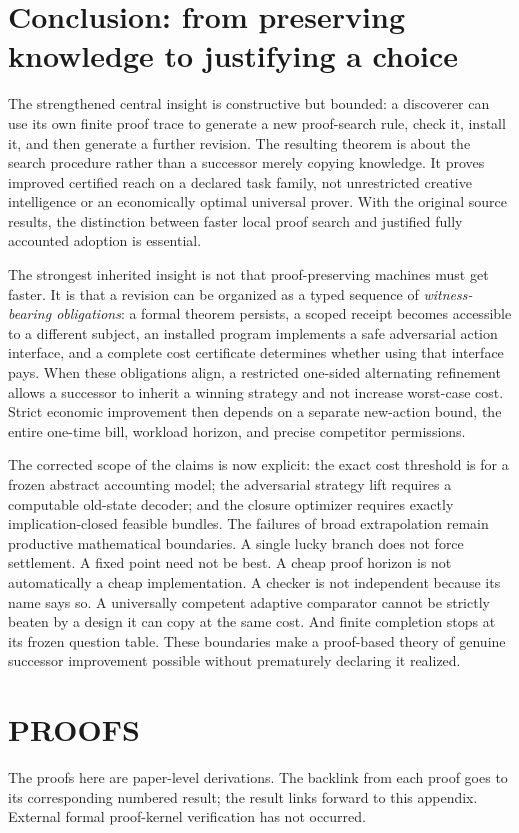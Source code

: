 \documentclass[11pt,letterpaper]{article}
\theoremstyle{definition}
\theoremstyle{remark}
\begin{document}
\section{Conclusion: from preserving knowledge to justifying a choice}
The strengthened central insight is constructive but bounded: a discoverer can use its own finite proof trace to generate a new proof-search rule, check it, install it, and then generate a further revision. The resulting theorem is about the search procedure rather than a successor merely copying knowledge. It proves improved certified reach on a declared task family, not unrestricted creative intelligence or an economically optimal universal prover. With the original source results, the distinction between faster local proof search and justified fully accounted adoption is essential.

The strongest inherited insight is not that proof-preserving machines must get faster. It is that a revision can be organized as a typed sequence of \emph{witness-bearing obligations}: a formal theorem persists, a scoped receipt becomes accessible to a different subject, an installed program implements a safe adversarial action interface, and a complete cost certificate determines whether using that interface pays. When these obligations align, a restricted one-sided alternating refinement allows a successor to inherit a winning strategy and not increase worst-case cost. Strict economic improvement then depends on a separate new-action bound, the entire one-time bill, workload horizon, and precise competitor permissions.

The corrected scope of the claims is now explicit: the exact cost threshold is for a frozen abstract accounting model; the adversarial strategy lift requires a computable old-state decoder; and the closure optimizer requires exactly implication-closed feasible bundles. The failures of broad extrapolation remain productive mathematical boundaries. A single lucky branch does not force settlement. A fixed point need not be best. A cheap proof horizon is not automatically a cheap implementation. A checker is not independent because its name says so. A universally competent adaptive comparator cannot be strictly beaten by a design it can copy at the same cost. And finite completion stops at its frozen question table. These boundaries make a proof-based theory of genuine successor improvement possible without prematurely declaring it realized.

\appendix
\section*{PROOFS}
\noindent The proofs here are paper-level derivations. The backlink from each proof goes to its corresponding numbered result; the result links forward to this appendix. External formal proof-kernel verification has not occurred.
\end{document}
